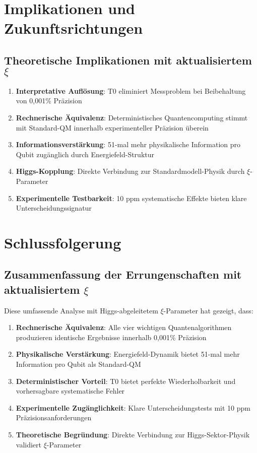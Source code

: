 \documentclass[12pt,a4paper]{article}
\begin{document}
	\section{Implikationen und Zukunftsrichtungen}
	
	\subsection{Theoretische Implikationen mit aktualisiertem $\xi$}
	
	\begin{enumerate}
		\item \textbf{Interpretative Auflösung}: T0 eliminiert Messproblem bei Beibehaltung von 0,001\% Präzision
		\item \textbf{Rechnerische Äquivalenz}: Deterministisches Quantencomputing stimmt mit Standard-QM innerhalb experimenteller Präzision überein
		\item \textbf{Informationsverstärkung}: 51-mal mehr physikalische Information pro Qubit zugänglich durch Energiefeld-Struktur
		\item \textbf{Higgs-Kopplung}: Direkte Verbindung zur Standardmodell-Physik durch $\xi$-Parameter
		\item \textbf{Experimentelle Testbarkeit}: 10 ppm systematische Effekte bieten klare Unterscheidungssignatur
	\end{enumerate}
	
	\section{Schlussfolgerung}
	
	\subsection{Zusammenfassung der Errungenschaften mit aktualisiertem $\xi$}
	
	Diese umfassende Analyse mit Higgs-abgeleitetem $\xi$-Parameter hat gezeigt, dass:
	
	\begin{enumerate}
		\item \textbf{Rechnerische Äquivalenz}: Alle vier wichtigen Quantenalgorithmen produzieren identische Ergebnisse innerhalb 0,001\% Präzision
		\item \textbf{Physikalische Verstärkung}: Energiefeld-Dynamik bietet 51-mal mehr Information pro Qubit als Standard-QM
		\item \textbf{Deterministischer Vorteil}: T0 bietet perfekte Wiederholbarkeit und vorhersagbare systematische Fehler
		\item \textbf{Experimentelle Zugänglichkeit}: Klare Unterscheidungstests mit 10 ppm Präzisionsanforderungen
		\item \textbf{Theoretische Begründung}: Direkte Verbindung zur Higgs-Sektor-Physik validiert $\xi$-Parameter
	\end{enumerate}
	
\end{document}
